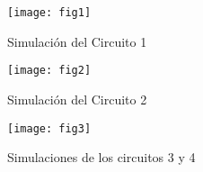 \documentclass[a4paper,12pt]{article}
\begin{document}
\vspace{.5cm}

\begin{figure}[!h]
\centering
	\texttt{[image: fig1]}
	\label{fig5}
	 \caption{Simulación del Circuito 1}
\end{figure}


\vspace{.5cm}

\begin{figure}[!h]
\centering
	\texttt{[image: fig2]}
	\label{fig5}
	 \caption{Simulación del Circuito 2}
\end{figure}

\vspace{.5cm}


\begin{figure}[!h]
\centering
	\texttt{[image: fig3]}
	\label{fig5}
	 \caption{Simulaciones de los circuitos 3 y 4}
\end{figure}

\vspace{.5cm}
\end{document}
